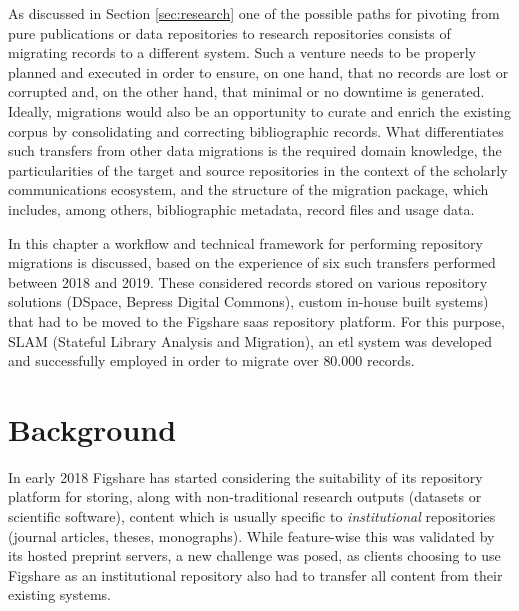 As discussed in Section \ref{sec:research} one of the possible paths for pivoting from pure publications or data repositories to research repositories consists of migrating records to a different system. Such a venture needs to be properly planned and executed in order to ensure, on one hand, that no records are lost or corrupted and, on the other hand, that minimal or no downtime is generated. Ideally, migrations would also be an opportunity to curate and enrich the existing corpus by consolidating and correcting bibliographic records. What differentiates such transfers from other data migrations is the required domain knowledge, the particularities of the target and source repositories in the context of the scholarly communications ecosystem, and the structure of the migration package, which includes, among others, bibliographic metadata, record files and usage data.

In this chapter a workflow and technical framework for performing repository migrations is discussed, based on the experience of six such transfers performed between 2018 and 2019. These considered records stored on various repository solutions (DSpace, Bepress Digital Commons), custom in-house built systems) that had to be moved to the Figshare \gls{saas} repository platform. For this purpose, SLAM (Stateful  Library  Analysis  and  Migration), an \gls{etl} system was developed and successfully employed in order to migrate over $80.000$ records. 

\newpage

\section{Background}
\label{sec:migbackground}

In early 2018 Figshare has started considering the suitability of its repository platform for storing, along with non-traditional research outputs (datasets or scientific software), content which is usually specific to \emph{institutional} repositories (journal articles, theses, monographs)\cite{fir}. While feature-wise this was validated by its hosted preprint servers\cite{chem}, a new challenge was posed, as clients choosing to use Figshare as an institutional repository also had to transfer all content from their existing systems.

